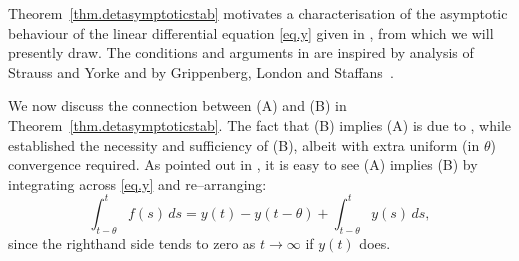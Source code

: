 \documentclass[a4paper,10pt,reqno]{amsart}
\numberwithin{equation}{section}
\newtheorem{lemma}{Lemma}
\theoremstyle{definition}
\theoremstyle{remark}
\DeclareMathOperator{\1}{\mathbbm 1}
\begin{document}
	Theorem~\ref{thm.detasymptoticstab} motivates a characterisation of the asymptotic behaviour of the linear differential equation \eqref{eq.y} given in \cite{AppLaw2024ODE}, from which we will presently draw. The conditions and arguments in \cite{AppLaw2024ODE} are inspired by analysis of Strauss and Yorke \cite{SY67a,SY67b} and by Grippenberg, London and Staffans~\cite[Lemma 15.9.2]{GLS}.  
	
	We now discuss the connection between (A) and (B) in Theorem~\ref{thm.detasymptoticstab}. The fact that (B) implies (A) is due to \cite{GLS}, while \cite{SY67a,SY67b} established the necessity and sufficiency of (B), albeit with extra uniform (in $\theta$) convergence required. As pointed out in \cite{AL:2023(AppliedNumMath)}, it is easy to see (A) implies (B) by integrating across \eqref{eq.y} and re--arranging: 
	\begin{equation}\label{eq.aveRepy}
		\int_{t-\theta}^t f(s)\,ds = y(t) - y(t-\theta) +\int_{t-\theta}^t y(s)\,ds,
	\end{equation}
	since the righthand side tends to zero as $t\to\infty$ if $y(t)$ does. 
	
\end{document}
